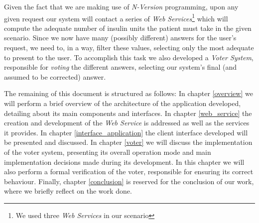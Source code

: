 Given the fact that we are making use of \emph{N-Version} programming, upon any given request our system will contact a series of \emph{Web Services}\footnote{We used three \emph{Web Services} in our scenario} which will compute the adequate number of insulin units the patient must take in the given scenario. Since we now have many (possibly different) answers for the user's request, we need to, in a way, filter these values, selecting only the most adequate to present to the user. To accomplish this task we also developed a \emph{Voter System}, responsible for \emph{voting} the different answers, selecting our system's final (and assumed to be corrected) answer.

The remaining of this document is structured as follows: In chapter \ref{overview} we will perform a brief overview of the architecture of the application developed, detailing about its main components and interfaces. In chapter \ref{web_service} the creation and development of the \emph{Web Service} is addressed as well as the services it provides. In chapter \ref{interface_application} the client interface developed will be presented and discussed. In chapter \ref{voter} we will discuss the implementation of the voter system, presenting its overall operation mode and main implementation decisions made during its development. In this chapter we will also perform a formal verification of the voter, responsible for ensuring its correct behaviour. Finally, chapter \ref{conclusion} is reserved for the conclusion of our work, where we briefly reflect on the work done.